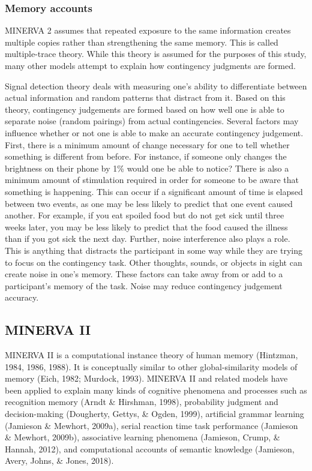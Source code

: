 \documentclass[
  english,
  man,floatsintext]{apa6}
\begin{document}
\hypertarget{memory-accounts}{%
\subsubsection{Memory accounts}\label{memory-accounts}}

MINERVA 2 assumes that repeated exposure to the same information creates multiple copies rather than strengthening the same memory. This is called multiple-trace theory. While this theory is assumed for the purposes of this study, many other models attempt to explain how contingency judgments are formed.

Signal detection theory deals with measuring one's ability to differentiate between actual information and random patterns that distract from it. Based on this theory, contingency judgements are formed based on how well one is able to separate noise (random pairings) from actual contingencies. Several factors may influence whether or not one is able to make an accurate contingency judgement. First, there is a minimum amount of change necessary for one to tell whether something is different from before. For instance, if someone only changes the brightness on their phone by 1\% would one be able to notice? There is also a minimum amount of stimulation required in order for someone to be aware that something is happening. This can occur if a significant amount of time is elapsed between two events, as one may be less likely to predict that one event caused another. For example, if you eat spoiled food but do not get sick until three weeks later, you may be less likely to predict that the food caused the illness than if you got sick the next day. Further, noise interference also plays a role. This is anything that distracts the participant in some way while they are trying to focus on the contingency task. Other thoughts, sounds, or objects in sight can create noise in one's memory. These factors can take away from or add to a participant's memory of the task. Noise may reduce contingency judgement accuracy.

\hypertarget{minerva-ii}{%
\subsection{MINERVA II}\label{minerva-ii}}

MINERVA II is a computational instance theory of human memory (Hintzman, 1984, 1986, 1988). It is conceptually similar to other global-similarity models of memory (Eich, 1982; Murdock, 1993). MINERVA II and related models have been applied to explain many kinds of cognitive phenomena and processes such as recognition memory (Arndt \& Hirshman, 1998), probability judgment and decision-making (Dougherty, Gettys, \& Ogden, 1999), artificial grammar learning (Jamieson \& Mewhort, 2009a), serial reaction time task performance (Jamieson \& Mewhort, 2009b), associative learning phenomena (Jamieson, Crump, \& Hannah, 2012), and computational accounts of semantic knowledge (Jamieson, Avery, Johns, \& Jones, 2018).
\end{document}
